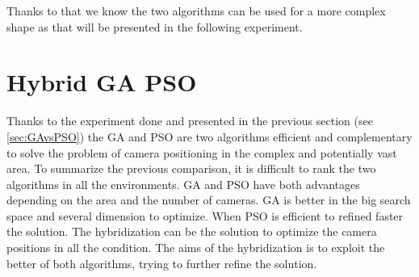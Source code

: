 Thanks to that we know the two algorithms can be used for a more complex shape as that will be presented in the following experiment.

 







\section{Hybrid GA PSO}
 

Thanks to the experiment done and presented in the previous section (see \ref{sec:GAvsPSO}) the GA and PSO are two algorithms efficient and complementary to solve the problem of camera positioning in the complex and potentially vast area.
  To summarize the previous comparison, it is difficult to rank the two algorithms in all the environments. GA and PSO have both advantages depending on the area and the number of cameras. GA is better in the big search space and several dimension to optimize. When PSO is efficient to refined faster the solution.
 The hybridization can be the solution to optimize the camera positions in all the condition. The aims of the hybridization is to exploit the better of both algorithms, trying to further refine the solution. 

